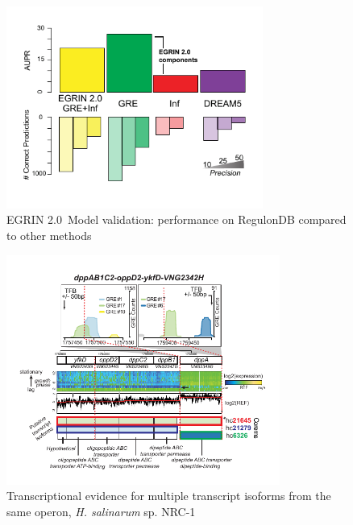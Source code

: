 \documentclass{article}
\newcommand{\tmsamp}[1]{\textsf{#1}}
\newcommand{\halo}{{\emph{H. salinarum} sp. NRC-1 }}
\newcommand{\egrine}{{\tmsamp{EGRIN 2.0}}}
\begin{document}
\begin{figure}[h!]
    \centering
    \includegraphics[width=0.75\textwidth]{figures/egrin2_AUPR}
 	\caption[\egrine~Model validation: performance on RegulonDB compared to other methods]{\egrine~Model validation: performance on RegulonDB compared to other methods}
    \label{fig:egrin2:2:A}
\end{figure}

\begin{figure}[h!]
    \centering
    \includegraphics[width=0.8\textwidth]{figures/egrin2_dpp_1}
 	\caption[Transcriptional evidence for multiple transcript isoforms from the same operon, \halo ]{Transcriptional evidence for multiple transcript isoforms from the same operon, \halo }
    \label{fig:egrin2:3:A}
\end{figure}
\end{document}
